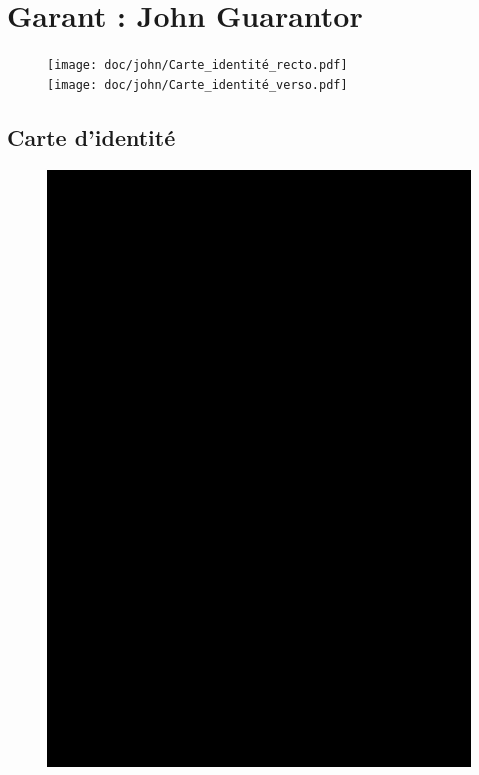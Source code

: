 \chapter{Garant : John Guarantor}
\hypertarget{chapter::\theHchapter}{}

\thispagestyle{empty}
\minitoc
\vspace{2cm}

\begin{figure}[H]
\centering
\texttt{[image: doc/john/Carte\_identité\_recto.pdf]}\\
\vspace{1cm}
\texttt{[image: doc/john/Carte\_identité\_verso.pdf]}
\end{figure}
\section{Carte d'identité}

\newpage
\begin{figure}[H]
\centering
\includegraphics[page=1, width=0.9\linewidth]{doc/john/Document_1.pdf}
\end{figure}
